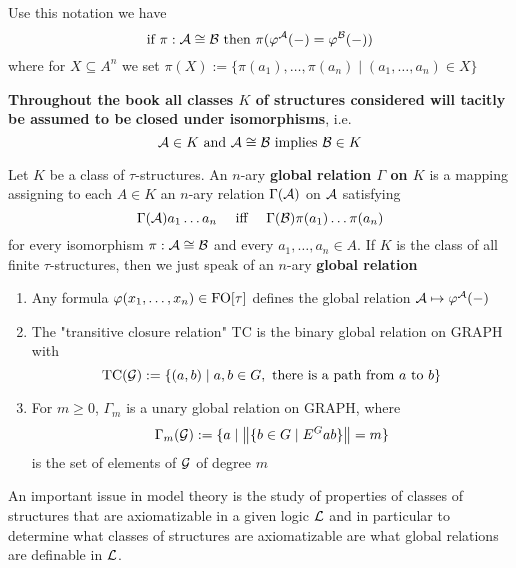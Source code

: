 \documentclass[11pt]{article}
\begin{document}
Use this notation we have
\begin{equation*}
\text{if }\pi:\mathcal{A}\cong\mathcal{B}\text{ then }\pi(\varphi^{\mathcal{A}}(-)=\varphi^{\mathcal{B}}(-))
\end{equation*}
where for \(X\subseteq A^n\) we set \(\pi(X):=\{\pi(a_1),\dots,\pi(a_n)\mid (a_1,\dots,a_n)\in X\}\)

\textbf{Throughout the book all classes \(K\) of structures considered will tacitly be assumed to be}
\textbf{closed under isomorphisms}, i.e.
\begin{equation*}
\mathcal{A}\in K \text{ and }\mathcal{A}\cong\mathcal{B}
\text{ implies }\mathcal{B}\in K
\end{equation*}

\begin{definition}[]
Let \(K\) be a class of \(\tau\)-structures. An \(n\)-ary
\textbf{global relation
\(\Gamma\) on \(K\)} is a mapping assigning to each \(A\in K\) an \(n\)-ary
relation \(\Gamma(\mathcal{A})\) on \(\mathcal{A}\) satisfying
\begin{equation*}
\Gamma(\mathcal{A})a_1\dots a_n\quad\text{ iff }\quad\Gamma(\mathcal{B})\pi(a_1)\dots\pi(a_n)
\end{equation*}
for every isomorphism \(\pi:\mathcal{A}\cong\mathcal{B}\) and every
\(a_1,\dots,a_n\in A\). If \(K\) is the class of all finite \(\tau\)-structures,
then we just speak of an \(n\)-ary \textbf{global relation}
\end{definition}

\begin{examplle}[]
\begin{enumerate}
\item Any formula \(\varphi(x_1,\dots,x_n)\in\text{FO}[\tau]\) defines the global
relation
\(\mathcal{A}\mapsto\varphi^{\mathcal{A}}(-)\)
\item The "transitive closure relation" TC is the binary global relation on
GRAPH with
\begin{equation*}
\operatorname{TC}(\mathcal{G}):=\{(a,b)\mid a,b\in G,\text{ there is a path from $a$ to $b$}\}
\end{equation*}
\item For \(m\ge0\), \(\Gamma_m\) is a unary global relation on GRAPH, where
\begin{equation*}
\Gamma_m(\mathcal{G}):=\{a\mid\left\lVert\{b\in G\mid E^Gab\}\right\rVert=m\}
\end{equation*}
is the set of elements of \(\mathcal{G}\) of degree \(m\)
\end{enumerate}
\end{examplle}

An important issue in model theory is the study of properties of classes of structures that are
axiomatizable in a given logic \(\mathcal{L}\) and in particular to determine what classes of
structures are axiomatizable are what global relations are definable in \(\mathcal{L}\).
\end{document}
